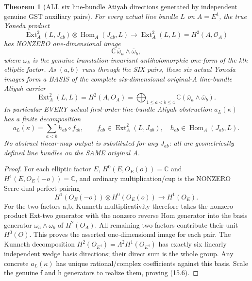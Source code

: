 \documentclass[11pt,a4paper]{article}
\newtheorem{theorem}{Theorem}[section]
\begin{document}
\begin{theorem}[ALL six line-bundle Atiyah directions generated by independent genuine GST auxiliary pairs]
For every actual
line bundle \(L\)
on \(A=E^4\),
the true Yoneda
product
\[
 \operatorname{Ext}^2_A(L,J_{ab})
 \otimes\operatorname{Hom}_A(J_{ab},L)
 \longrightarrow
 \operatorname{Ext}^2_A(L,L)
 =H^2(A,\mathcal O_A)
                                                               \tag{15.4}
\]
has NONZERO
one-dimensional
image
\[
  \mathbb C\,
       \overline\omega_a
                \wedge\overline\omega_b ,
\]
where
\(\overline\omega_k\)
is the genuine
translation-invariant
antiholomorphic
one-form of
the kth elliptic
factor. As
\((a,b)\)
runs through
the SIX pairs,
these six actual
Yoneda images
form a BASIS of
the complete
six-dimensional
original-A
line-bundle
Atiyah carrier
\[
 \boxed{
 \operatorname{Ext}^2_A(L,L)
   =H^2(A,O_A)
   =\bigoplus_{1\le a<b\le4}
      \mathbb C(\overline\omega_a
                         \wedge\overline\omega_b).
 }                                                       \tag{15.5}
\]
In particular EVERY
actual first-order
line-bundle
Atiyah obstruction
\(a_L(\kappa)\)
has a finite
decomposition
\[
 \boxed{
 a_L(\kappa)
   =\sum_{a<b} h_{ab}
                \circ f_{ab},
 \qquad
 f_{ab}\in\operatorname{Ext}^2_A(L,J_{ab}),
 \quad
 h_{ab}\in\operatorname{Hom}_A(J_{ab},L).
 }                                                       \tag{15.6}
\]
No abstract
linear-map output
is substituted
for any
\(J_{ab}\):
all are
geometrically
defined
line bundles on
the SAME original A.
\end{theorem}
\begin{proof}
For each
elliptic factor
\(E\),
\(
 H^0(E,O_E(o))
 =\mathbb C
\)
and
\(
 H^1(E,O_E(-o))
 =\mathbb C
\),
and ordinary
multiplication/cup
is the NONZERO
Serre-dual
perfect pairing
\[
 H^1(O_E(-o))\otimes
 H^0(O_E(o))
     \to H^1(O_E).
\]
For the two factors
a,b, Kunneth
multiplicativity
therefore takes
the nonzero
product Ext-two
generator with
the nonzero
reverse Hom
generator into
the basis
generator
\(
 \overline\omega_a
          \wedge\overline\omega_b
\)
of \(H^2(O_A)\).
All remaining
two factors
contribute their
unit \(H^0(O)\).
This proves
the asserted
one-dimensional
image for
each pair.
The Kunneth
decomposition
\(
 H^2(O_{E^4})
 =\Lambda^2H^1(O_{E^4})
\)
has exactly
six linearly
independent
wedge basis
directions;
their direct
sum is the
whole group.
Any concrete
\(a_L(\kappa)\)
has unique
rational/complex
coefficients
against this
basis. Scale the
genuine f and h
generators to
realize them,
proving (15.6).
\end{proof}
\end{document}
